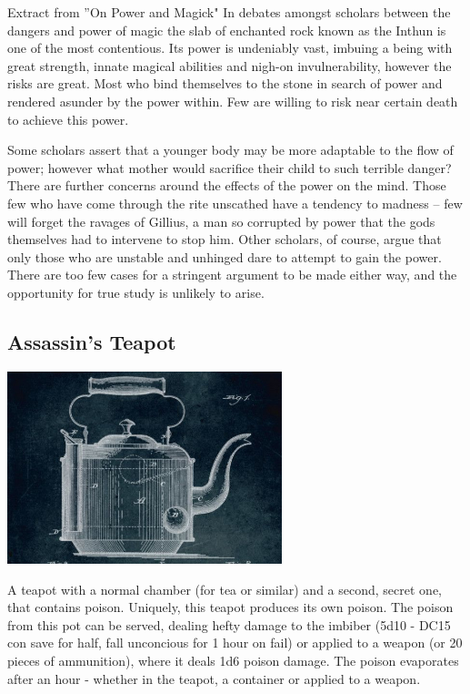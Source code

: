 \begin{DndComment}{Extract from ''On Power and Magick"}
In debates amongst scholars between the dangers and power of magic the slab of enchanted rock known as the Inthun is one of the most contentious. Its power is undeniably vast, imbuing a being with great strength, innate magical abilities and nigh-on invulnerability, however the risks are great. Most who bind themselves to the stone in search of power and rendered asunder by the power within. Few are willing to risk near certain death to achieve this power.

Some scholars assert that a younger body may be more adaptable to the flow of power; however what mother would sacrifice their child to such terrible danger? There are further concerns around the effects of the power on the mind. Those few who have come through the rite unscathed have a tendency to madness – few will forget the ravages of Gillius, a man so corrupted by power that the gods themselves had to intervene to stop him. Other scholars, of course, argue that only those who are unstable and unhinged dare to attempt to gain the power. There are too few cases for a stringent argument to be made either way, and the opportunity for true study is unlikely to arise.
\end{DndComment}

\smallskip

\subsection*{Assassin's Teapot} 

\begin{center}
\includegraphics[width=80mm]{./content/img/teapot2.jpg}
\begin{figure}[h]
\end{figure}
\end{center}

\noindent 

A teapot with a normal chamber (for tea or similar) and a second, secret one, that contains poison. Uniquely, this teapot produces its own poison. 	The poison from this pot can be served, dealing hefty damage to the imbiber (5d10 - DC15 con save for half, fall unconcious for 1 hour on fail) or applied to a weapon (or 20 pieces of ammunition), where it deals 1d6 poison damage. The poison evaporates after an hour - whether in the teapot, a container or applied to a weapon.

